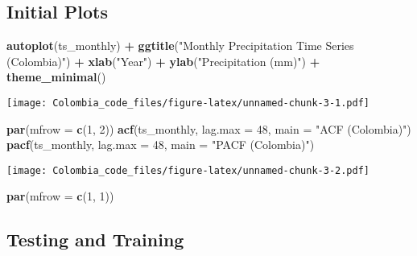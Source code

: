 \documentclass[
]{article}
\newenvironment{Shaded}{\begin{snugshade}}{\end{snugshade}}
\newcommand{\AttributeTok}[1]{\textcolor[rgb]{0.13,0.29,0.53}{#1}}
\newcommand{\DecValTok}[1]{\textcolor[rgb]{0.00,0.00,0.81}{#1}}
\newcommand{\FunctionTok}[1]{\textcolor[rgb]{0.13,0.29,0.53}{\textbf{#1}}}
\newcommand{\NormalTok}[1]{#1}
\newcommand{\SpecialCharTok}[1]{\textcolor[rgb]{0.81,0.36,0.00}{\textbf{#1}}}
\newcommand{\StringTok}[1]{\textcolor[rgb]{0.31,0.60,0.02}{#1}}
\begin{document}
\subsection{Initial Plots}\label{initial-plots}

\begin{Shaded}
\begin{Highlighting}[]
\FunctionTok{autoplot}\NormalTok{(ts\_monthly) }\SpecialCharTok{+} \FunctionTok{ggtitle}\NormalTok{(}\StringTok{"Monthly Precipitation Time Series (Colombia)"}\NormalTok{) }\SpecialCharTok{+}
    \FunctionTok{xlab}\NormalTok{(}\StringTok{"Year"}\NormalTok{) }\SpecialCharTok{+} \FunctionTok{ylab}\NormalTok{(}\StringTok{"Precipitation (mm)"}\NormalTok{) }\SpecialCharTok{+} \FunctionTok{theme\_minimal}\NormalTok{()}
\end{Highlighting}
\end{Shaded}

\texttt{[image: Colombia\_code\_files/figure-latex/unnamed-chunk-3-1.pdf]}

\begin{Shaded}
\begin{Highlighting}[]
\FunctionTok{par}\NormalTok{(}\AttributeTok{mfrow =} \FunctionTok{c}\NormalTok{(}\DecValTok{1}\NormalTok{, }\DecValTok{2}\NormalTok{))}
\FunctionTok{acf}\NormalTok{(ts\_monthly, }\AttributeTok{lag.max =} \DecValTok{48}\NormalTok{, }\AttributeTok{main =} \StringTok{"ACF (Colombia)"}\NormalTok{)}
\FunctionTok{pacf}\NormalTok{(ts\_monthly, }\AttributeTok{lag.max =} \DecValTok{48}\NormalTok{, }\AttributeTok{main =} \StringTok{"PACF (Colombia)"}\NormalTok{)}
\end{Highlighting}
\end{Shaded}

\texttt{[image: Colombia\_code\_files/figure-latex/unnamed-chunk-3-2.pdf]}

\begin{Shaded}
\begin{Highlighting}[]
\FunctionTok{par}\NormalTok{(}\AttributeTok{mfrow =} \FunctionTok{c}\NormalTok{(}\DecValTok{1}\NormalTok{, }\DecValTok{1}\NormalTok{))}
\end{Highlighting}
\end{Shaded}

\subsection{Testing and Training}\label{testing-and-training}
\end{document}
